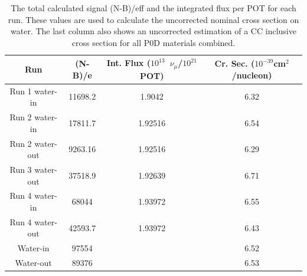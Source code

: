 \begin{table}[h]
\caption{The total calculated signal (N-B)/eff and the integrated flux per POT for each run. These values are used to calculate the uncorrected nominal cross section on water. The last column also shows an uncorrected estimation of a CC inclusive cross section for all P0D materials combined.}
\centering
\begin{tabular}{cccc} \toprule
Run & (N-B)/e & Int. Flux ($10^{13}$~$\nu_\mu$/$10^{21}$ POT) & Cr. Sec. ($10^{-39}$cm$^2$/nucleon)\\
\hline
Run 1 water-in & 11698.2 & 1.9042 & 6.32\\ 
Run 2 water-in & 17811.7 & 1.92516 & 6.54\\ 
Run 2 water-out & 9263.16 & 1.92516 & 6.29\\ 
Run 3 water-out & 37518.9 & 1.92639 & 6.71\\ 
Run 4 water-in & 68044 & 1.93972 & 6.55\\ 
Run 4 water-out & 42593.7 & 1.93972 & 6.43\\ 
\hline
Water-in & 97554 & & 6.52\\
Water-out & 89376 & & 6.53\\
\hline
\bottomrule
\end{tabular} 
\label{tab:xscalc}
\end{table}